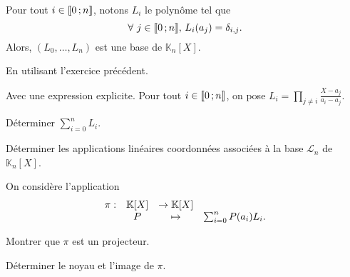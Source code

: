 \begin{defi}
Pour tout $i \in \llbracket 0\,; n \rrbracket$, notons $L_i$ le polynôme tel que
\[
\forall\, j \in \interent{0}{n},\, L_i(a_j) = \delta_{i,j}.
\]
Alors, $(L_0,\ldots,L_n)$ est une base de $\mathbb{K}_n[X]$.
\end{defi}

\begin{exercice}
\begin{questions}
\item En utilisant l'exercice précédent.
\begin{questions}
\item 
\end{questions}

\item Avec une expression explicite. Pour tout $i \in \llbracket 0\,; n \rrbracket$, on pose $L_i = \prod\limits_{j \neq i} \frac{X - a_j}{a_i - a_j}$.
\begin{questions}

\item

\end{questions}

\item Déterminer $\sum\limits_{i=0}^n L_i$.

\item Déterminer les applications linéaires coordonnées associées à la base $\mathscr{L}_n$ de $\mathbb{K}_n[X]$.

\item On considère l'application
\[
\begin{array}{lccc}
\pi : &\mathbb{K}[X]&\to\mathbb{K}[X]\\
&P&\mapsto&\sum_{i=0}^n P(a_i) L_i.
\end{array}
\]
\begin{questions}
\item Montrer que $\pi$ est un projecteur.

\item Déterminer le noyau et l'image de $\pi$.
\end{questions}
\end{questions}
\end{exercice}


